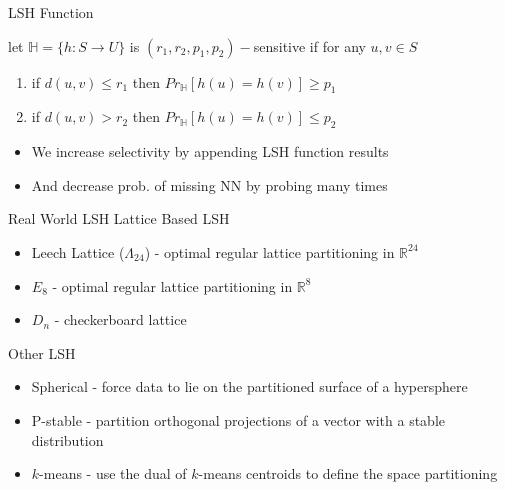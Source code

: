 \documentclass[12pt]{beamer}
\begin{document}
\begin{frame}[plain]{LSH Function}

 \begin{Definition}
let $\mathbb{H}=\{h:S \rightarrow U\}$ is $(r_1,r_2,p_1,p_2)-$sensitive if for 
any $u,v\in S$
 \begin{enumerate}
   \item if $d(u,v) \leq r_1$ then $Pr_{\mathbb{H}}[h(u)=h(v)]\geq p_1$
   \item if $d(u,v) > r_2$ then $Pr_{\mathbb{H}}[h(u)=h(v)]\leq p_2$
 \end{enumerate}
\end{Definition}
\begin{itemize}
 \item We increase selectivity by appending LSH function results
 \item And decrease prob. of missing NN by probing many times
\end{itemize}

\end{frame}

\begin{frame}[plain]{Real World LSH}
Lattice Based LSH
\begin{itemize}
 \item Leech Lattice ($\Lambda_{24}$) - optimal regular lattice partitioning in $\mathbb{R}^{24}$
 \item $E_8$ - optimal regular lattice partitioning in $\mathbb{R}^{8}$
 \item $D_n$ - checkerboard lattice
\end{itemize}
Other LSH
\begin{itemize}
 \item Spherical - force data to lie on the partitioned surface of a hypersphere
 \item P-stable - partition orthogonal projections of a vector with a stable distribution
 \item $k$-means - use the dual of $k$-means centroids to define the space partitioning
\end{itemize}
\end{frame}
\end{document}
